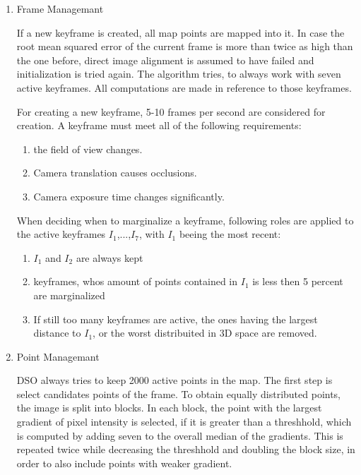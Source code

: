	\begin{enumerate}
	\item{Frame Managemant}
	
	If a new keyframe is created, all map points are mapped into it. In case the root mean squared error of the current frame is more than twice as high than the one before, 
	direct image alignment is assumed to have failed and initialization is tried again. The algorithm tries, to always work with seven active keyframes. All computations are 
	made in reference to those keyframes. 
	
	For creating a new keyframe, 5-10 frames per second are considered for creation. A keyframe must meet all of the following requirements: 
	
	\begin{enumerate}
	\item{}
	the field of view changes.
	\item{}
	Camera translation causes occlusions. %
	\item{}
	Camera exposure time changes significantly. 
	\end{enumerate}
	
	When deciding when to marginalize a keyframe, following roles are applied to the active keyframes $I_1$,...,$I_7$, with $I_1$ beeing the most recent: 
	
	\begin{enumerate}
	\item{}
	$I_1$ and $I_2$ are always kept
	\item{}
	keyframes, whos amount of points contained in $I_1$ is less then 5 percent are marginalized
	\item{}
	If still too many keyframes are active, the ones having the largest distance to $I_1$, or the worst distribuited in 3D space are removed. 
	\end{enumerate}
	
	\item{Point Managemant}
	
	DSO always tries to keep 2000 active points in the map. The first step is select candidates points of the frame. To obtain equally 
	distributed points, the image is split into blocks. In each block, the point with the largest gradient of pixel intensity is selected, if 
	it is greater than a threshhold, which is computed by adding seven to the overall median of the gradients. This is repeated twice while 
	decreasing the threshhold and doubling the block size, in order to also include points with weaker gradient. 
	

\end{enumerate}
